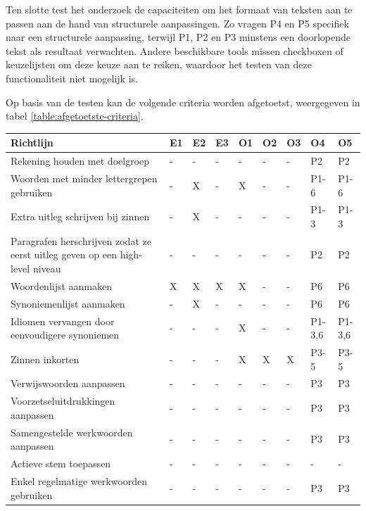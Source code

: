 \medspace

Ten slotte test het onderzoek de capaciteiten om het formaat van teksten aan te passen aan de hand van structurele aanpassingen. Zo vragen P4 en P5 specifiek naar een structurele aanpassing, terwijl P1, P2 en P3 minstens een doorlopende tekst als resultaat verwachten. Andere beschikbare tools missen checkboxen of keuzelijsten om deze keuze aan te reiken, waardoor het testen van deze functionaliteit niet mogelijk is.

\medspace

Op basis van de testen kan de volgende criteria worden afgetoetst, weergegeven in tabel \ref{table:afgetoetste-criteria}.

\begin{table}[H]
	\centering
\begin{tabular}{ | m{8cm} | m{0.5cm} | m{0.5cm} | m{0.5cm} | m{0.5cm} | m{0.5cm} | m{0.5cm} | m{1cm} | m{1cm} | }
		\hline
		Richtlijn & E1 & E2 & E3 & O1 & O2 & O3 & O4 & O5 \\ \hline
		Rekening houden met doelgroep & - & - & - & - & - & - & P2 & P2 \\ \hline
		Woorden met minder lettergrepen gebruiken & - & X & - & X & - & - & P1-6 & P1-6 \\ \hline
		Extra uitleg schrijven bij zinnen & - & X & - & - & - & - & P1-3 & P1-3 \\ \hline
		Paragrafen herschrijven zodat ze eerst uitleg geven op een high-level niveau & - & - & - & - & - & - & P2 & P2 \\ \hline
		Woordenlijst aanmaken & X & X & X & X & - & - & P6 & P6 \\ \hline
		Synoniemenlijst aanmaken & - & X & - & - & - & - & P6 & P6 \\ \hline
		Idiomen vervangen door eenvoudigere synoniemen & - & - & - & X & - & - & P1-3,6 & P1-3,6 \\ \hline
		Zinnen inkorten & - & - & - & X & X & X & P3-5 & P3-5 \\ \hline
		Verwijswoorden aanpassen & - & - & - & - & - & - & P3 & P3 \\ \hline
		Voorzetseluitdrukkingen aanpassen & - & - & - & - & - & - & P3 & P3 \\ \hline
		Samengestelde werkwoorden aanpassen & - & - & - & - & - & - & P3 & P3 \\ \hline
		Actieve stem toepassen & - & - & - & - & - & - & - & - \\ \hline
		Enkel regelmatige werkwoorden gebruiken & - & - & - & - & - & - & P3 & P3 \\ \hline

\end{tabular}
\end{table}
